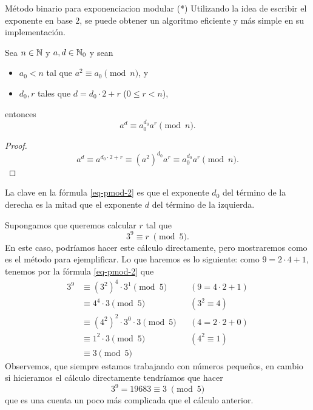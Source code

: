 \begin{section}{Método binario para exponenciacion modular (*)}
Utilizando la idea de escribir el exponente en base $2$, se puede obtener un algoritmo eficiente y más simple en su implementación.

\begin{proposicion}\label{prop-exp-mod}
    Sea $n \in {\mathbb N}$ y $a,d \in {\mathbb N}_0$ y sean
    \begin{itemize}
        \item $a_0 < n$ tal que $a^2 \equiv a_0 \pmod{n}$, y
        \item $d_0, r$ tales que $d = d_0\cdot 2 + r$ ($0 \le r <n$),
    \end{itemize}
    entonces
    \begin{equation}\label{eq-pmod-2}
        a^d \equiv  a_0^{d_0}  a^r \pmod n.
    \end{equation}
\end{proposicion}
\begin{proof}
    $$
    a^d \equiv a^{d_0\cdot 2 + r} \equiv  (a^2)^{d_0}  a^r  \equiv  a_0^{d_0}  a^r \pmod n.
    $$
\end{proof}
 La clave en la fórmula \eqref{eq-pmod-2} es que el exponente $d_0$ del término de la derecha es la mitad  que el exponente $d$ del término de la izquierda. 

\begin{ejemplo*}
Supongamos que queremos calcular $r$ tal que 
$$3^{9} \equiv r\; \pmod 5.$$
En  este caso, podríamos hacer este cálculo  directamente, pero mostraremos como es el método para ejemplificar. Lo  que haremos es lo siguiente: como $9 = 2\cdot 4 + 1$, tenemos por la fórmula \eqref{eq-pmod-2} que 
\begin{align*}
    3^9  &\equiv (3^2)^4 \cdot 3^1 \pmod{5}& &(9 = 4 \cdot 2 +1) \\
            &\equiv 4^4 \cdot 3 \pmod{5}   && (3^2 \equiv 4) \\%
            &\equiv (4^2)^2\cdot 3^0 \cdot 3 \pmod{5}&& (4 = 2\cdot 2 +0) \\
            &\equiv 1^2 \cdot 3 \pmod{5}    && (4^2 \equiv 1)\\%
            &\equiv 3 \pmod{5}&&
\end{align*}
Observemos,  que  siempre estamos trabajando con números pequeños,  en cambio si hicieramos el cálculo directamente  tendríamos que hacer 
$$3^{9} = 19683 \equiv 3\; \pmod 5$$
que es una cuenta un poco más complicada que el cálculo anterior.
\end{ejemplo*}


\end{section}
